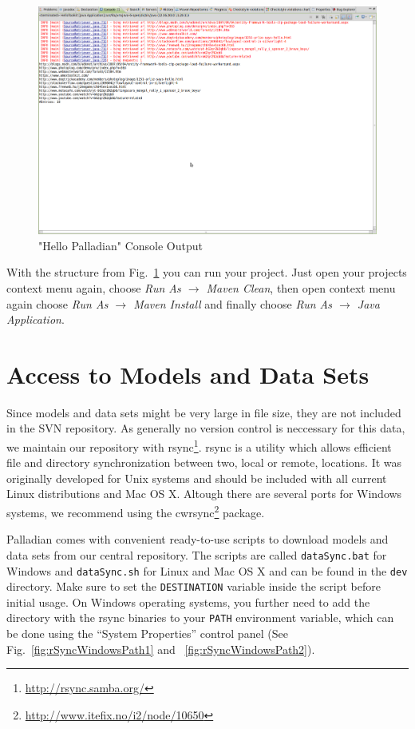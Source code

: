 \documentclass[a4paper,twoside]{book}      %
\begin{document}
\begin{figure}
\centering
\includegraphics[trim=0 550px 100px 0,clip=true,width=\textwidth]{img/ht14.png}
\caption{"Hello Palladian" Console Output}
\label{fig:structure}
\end{figure}
With the structure from Fig.~\ref{fig:structure} you can run your project. Just open your projects context menu again, choose \textit{Run As $\rightarrow$ Maven Clean}, then open context menu again choose \textit{Run As $\rightarrow$ Maven Install} and finally choose \textit{Run As $\rightarrow$ Java Application}.

\section{Access to Models and Data Sets} \label{sec:AccessModelsDataSets}

Since models and data sets might be very large in file size, they are not included in the SVN repository. As generally no version control is neccessary for this data, we maintain our repository with rsync\footnote{\url{http://rsync.samba.org/}}. rsync is a utility which allows efficient file and directory synchronization between two, local or remote, locations. It was originally developed for Unix systems and should be included with all current Linux distributions and Mac OS X. Altough there are several ports for Windows systems, we recommend using the cwrsync\footnote{\url{http://www.itefix.no/i2/node/10650}} package. 

Palladian comes with convenient ready-to-use scripts to download models and data sets from our central repository. The scripts are called \texttt{dataSync.bat} for Windows and \texttt{dataSync.sh} for Linux and Mac OS X and can be found in the \texttt{dev} directory. Make sure to set the \texttt{DESTINATION} variable inside the script before initial usage. On Windows operating systems, you further need to add the directory with the rsync binaries to your \texttt{PATH} environment variable, which can be done using the ``System Properties'' control panel (See Fig.~\ref{fig:rSyncWindowsPath1} and ~\ref{fig:rSyncWindowsPath2}).
\end{document}
